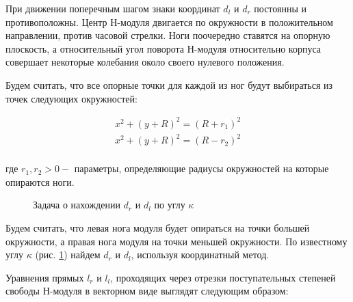 При движении поперечным шагом знаки координат $d_l$ и $d_r$ постоянны и противоположны. Центр Н-модуля двигается по окружности в положительном направлении, против часовой стрелки. Ноги поочередно ставятся на опорную плоскость, а относительный угол поворота Н-модуля относительно корпуса совершает некоторые колебания около своего нулевого положения.

Будем считать, что все опорные точки для каждой из ног будут выбираться из точек следующих окружностей:

\begin{equation}
	\begin{array}{lcr}
	x^2+(y+R)^2 = (R+r_1)^2\\
	x^2+(y+R)^2 = (R-r_2)^2\\
	\end{array}
	\label{step_circles}
\end{equation}

где $r_1,r_2>0-$ параметры, определяющие радиусы окружностей на которые опираются ноги.

\begin{figure}
\caption{Задача о нахождении $d_r$ и $d_l$ по углу $\kappa$}
\label{dldrdraw}
\end{figure}

Будем считать, что левая нога модуля будет опираться на точки большей окружности, а правая нога модуля на точки  меньшей окружности. По известному углу $\kappa$ (рис. \ref{dldrdraw}) найдем $d_r$ и $d_l$, используя координатный метод.

Уравнения прямых $l_r$ и $l_l$, проходящих через отрезки поступательных степеней свободы Н-модуля в векторном виде выглядят следующим образом:

